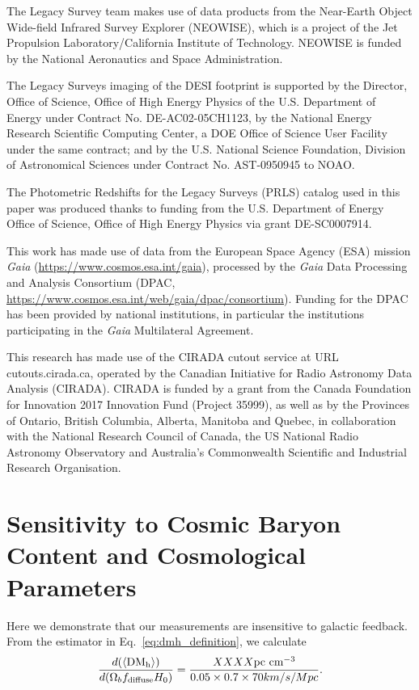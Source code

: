 \documentclass[twocolumn]{aastex631}
\newcommand{\dmh}{\ensuremath{{\rm DM}_\textrm{h}}}
\begin{document}
The Legacy Survey team makes use of data products from the Near-Earth Object Wide-field Infrared Survey Explorer (NEOWISE), which is a project of the Jet Propulsion Laboratory/California Institute of Technology. NEOWISE is funded by the National Aeronautics and Space Administration.

The Legacy Surveys imaging of the DESI footprint is supported by the Director, Office of Science, Office of High Energy Physics of the U.S. Department of Energy under Contract No. DE-AC02-05CH1123, by the National Energy Research Scientific Computing Center, a DOE Office of Science User Facility under the same contract; and by the U.S. National Science Foundation, Division of Astronomical Sciences under Contract No. AST-0950945 to NOAO.

The Photometric Redshifts for the Legacy Surveys (PRLS) catalog used in this paper was produced thanks to funding from the U.S. Department of Energy Office of Science, Office of High Energy Physics via grant DE-SC0007914.

This work has made use of data from the European Space Agency (ESA) mission
{\it Gaia} (\url{https://www.cosmos.esa.int/gaia}), processed by the {\it Gaia}
Data Processing and Analysis Consortium (DPAC,
\url{https://www.cosmos.esa.int/web/gaia/dpac/consortium}). Funding for the DPAC
has been provided by national institutions, in particular the institutions
participating in the {\it Gaia} Multilateral Agreement.

This research has made use of the CIRADA cutout service at URL cutouts.cirada.ca, operated by the Canadian Initiative for Radio Astronomy Data Analysis (CIRADA). CIRADA is funded by a grant from the Canada Foundation for Innovation 2017 Innovation Fund (Project 35999), as well as by the Provinces of Ontario, British Columbia, Alberta, Manitoba and Quebec, in collaboration with the National Research Council of Canada, the US National Radio Astronomy Observatory and Australia’s Commonwealth Scientific and Industrial Research Organisation. 
\vspace{5mm}
\appendix
\section{Sensitivity to Cosmic Baryon Content and Cosmological Parameters}
Here we demonstrate that our measurements are insensitive to galactic feedback. From the estimator in Eq.~\ref{eq:dmh_definition}, we calculate 
$$\dfrac{d(\langle\dmh\rangle)}{d(\Omega_b f_\text{diffuse} H_0)} = \dfrac{XXXX\textrm{pc cm}^{-3}}{0.05 \times 0.7 \times 70 km/s/Mpc}.$$
\end{document}
